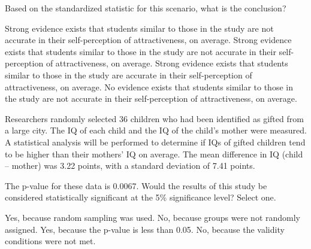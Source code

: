 \documentclass{article}
\begin{document}
\begin{mcquestions}
		\question[follow] Based on the standardized statistic for this scenario, what is the conclusion? \label{self-societal-3}
		\begin{mcanswerslist}
			\answer[correct] Strong evidence exists that students similar to those in the study are not accurate in their self-perception of attractiveness, on average.
			\answer Strong evidence exists that students similar to those in the study are not accurate in their self-perception of attractiveness, on average.
			\answer Strong evidence exists that students similar to those in the study are accurate in their self-perception of attractiveness, on average.
			\answer No evidence exists that students similar to those in the study are not accurate in their self-perception of attractiveness, on average.
		\end{mcanswerslist}
		
		\question Researchers randomly selected 36 children who had been identified as gifted from a large city. The IQ of each child and the IQ of the child's mother were measured. A statistical analysis will be performed to determine if IQs of gifted children tend to be higher than their mothers' IQ on average. The mean difference in IQ (child – mother) was 3.22 points, with a standard deviation of 7.41 points.
		
		The p-value for these data is 0.0067. Would the results of this study be considered statistically significant at the 5\% significance level?  Select one. 
		\begin{mcanswerslist}
			\answer Yes, because random sampling was used.
			\answer No, because groups were not randomly assigned.
			\answer[correct] Yes, because the p-value is less than 0.05.
			\answer No, because the validity conditions were not met.
		\end{mcanswerslist}
		
		
	\end{mcquestions}
\end{document}
